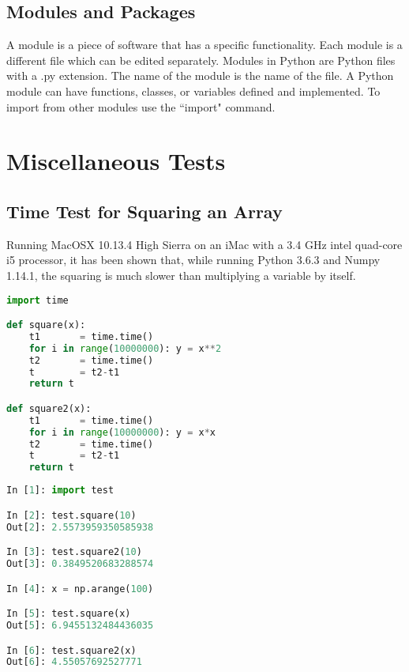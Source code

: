 \documentclass[crop=false,class=book]{standalone}
\begin{document}
\subsection{Modules and Packages}
A module is a piece of software that has a specific functionality. Each module is a different file which can be edited separately. Modules in Python are Python files with a .py extension. The name of the module is the name of the file. A Python module can have functions, classes, or variables defined and implemented. To import from other modules use the ``import" command.
\section{Miscellaneous Tests}
\subsection{Time Test for Squaring an Array}
Running MacOSX 10.13.4 High Sierra on an iMac with a 3.4 GHz intel quad-core i5 processor, it has been shown that, while running Python 3.6.3 and Numpy 1.14.1, the squaring is much slower than multiplying a variable by itself.\newline
\begin{minipage}[t]{.48\textwidth}
\begin{lstlisting}[language=python,frame=single,basicstyle=\footnotesize,caption=Python Code Located in `test.py']
import time

def square(x):
    t1       = time.time()
    for i in range(10000000): y = x**2
    t2       = time.time()
    t        = t2-t1
    return t

def square2(x):
    t1       = time.time()
    for i in range(10000000): y = x*x
    t2       = time.time()
    t        = t2-t1
    return t
\end{lstlisting}
\end{minipage}\hfill
\begin{minipage}[t]{.48\textwidth}
\begin{lstlisting}[language=python,frame=single,basicstyle=\footnotesize,caption=Inside iPython]
In [1]: import test

In [2]: test.square(10)
Out[2]: 2.5573959350585938

In [3]: test.square2(10)
Out[3]: 0.3849520683288574

In [4]: x = np.arange(100)

In [5]: test.square(x)
Out[5]: 6.9455132484436035

In [6]: test.square2(x)
Out[6]: 4.55057692527771
\end{lstlisting}
\end{minipage}\newline
\end{document}
